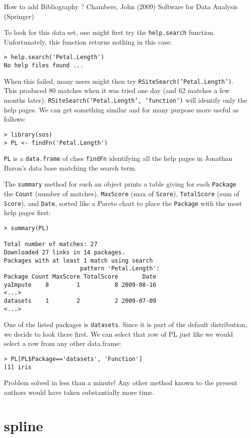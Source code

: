 How to add Bibliography ?
Chambers, John (2009) Software for Data Analysis (Springer)

To look for this data set, one might first try 
the {\tt help.search} function.  Unfortunately, this function 
returns nothing in this case:  
\begin{verbatim}
> help.search('Petal.Length')
No help files found ...
\end{verbatim}
When this failed, many users might then try
{\tt RSiteSearch('Petal.Length')}.  This produced 80 matches 
when it was tried one day (and 62 matches a few months later).
{\tt RSiteSearch('Petal.Length', 'function')} will identify
only the help pages.  We can get something similar and for 
many purpose more useful as follows:
\begin{verbatim}
> library(sos)
> PL <- findFn('Petal.Length')
\end{verbatim}
{\tt PL} is a {\tt data.frame} of class {\tt findFn} identifying
all the help pages in Jonathan Baron's data base matching the
search term.

The {\tt summary} method for such an object prints a table giving 
for each {\tt Package} the {\tt Count} (number of matches), 
{\tt MaxScore} (max of {\tt Score}), {\tt TotalScore} (sum of 
{\tt Score}), and {\tt Date}, sorted like a Pareto chart to place 
the {\tt Package} with the most help pages first:
\begin{verbatim}
> summary(PL)

Total number of matches: 27
Downloaded 27 links in 14 packages.
Packages with at least 1 match using search
                      pattern 'Petal.Length':
Package Count MaxScore TotalScore       Date
yaImpute    8        1          8 2009-08-16
<...>
datasets    1        2          2 2009-07-09
<...>
\end{verbatim}
One of the listed packages is {\tt datasets}.  Since it is part of the
default \R{} distribution, we decide to look there first.  We can
select that row of PL just like we would select a row from any other
data.frame:
\begin{verbatim}
> PL[PL$Package=='datasets', 'Function']
[1] iris
\end{verbatim}
Problem solved in less than a minute!  Any other method known
to the present authors would have taken substantially more time.

\section*{spline}

